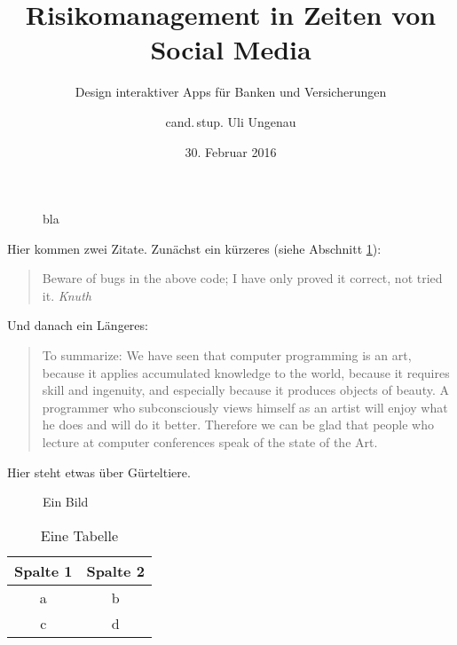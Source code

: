\documentclass{scrreprt}
\begin{document}
	\titlehead{\Large Universität Schlauenheim}
	\subject{Masterarbeit}
	\title{Risikomanagement in Zeiten von Social Media}
	\subtitle{Design interaktiver Apps für Banken und Versicherungen}
	\author{cand.\,stup. Uli Ungenau}
	\date{30. Februar 2016}
	\publishers{Betreut durch Prof.\,Dr.\,rer.\,stup. Naseweis}
	\dedication{Für meine Mama.}

	\maketitle
	
	\begin{abstract}
		\noindent\blindtext
	\end{abstract}
	
	\tableofcontents
	\listoffigures
	\listoftables
	
	
	\blinddocument

\begin{figure}

	\caption{bla	\label{fig:ende}}

\end{figure}
	

	Hier kommen zwei Zitate. Zunächst ein kürzeres (siehe Abschnitt \cref{fig:ende}):
	\begin{quote}
		Beware of bugs in the above code; I have only proved it correct, not tried it. \hfill\textit{Knuth}
	\end{quote}
	Und danach ein Längeres:
	\begin{quotation}
		To summarize: We have seen that computer programming is an art, because it applies accumulated knowledge to the world, because it requires skill and ingenuity, and especially because it produces objects of beauty. A programmer who subconsciously views himself as an artist will enjoy what he does and will do it better. Therefore we can be glad that people who lecture at computer conferences speak of the state of the Art. \cite{knuth74}
	\end{quotation}
	
	Hier steht etwas über Gürteltiere. \cite{autor88}  \blindtext
	
	\begin{figure}
		\centering
		\caption{Ein Bild}
		\label{fig:dasbild}
	\end{figure}
	
	\begin{table}
		\centering
		\begin{tabular}{cc}
			\toprule
			Spalte 1 & Spalte 2\\
			\midrule
			a & b \\
			c & d
		\end{tabular}
		\caption{Eine Tabelle}
		\label{tab:dietabelle}
	\end{table}
	
\end{document}
